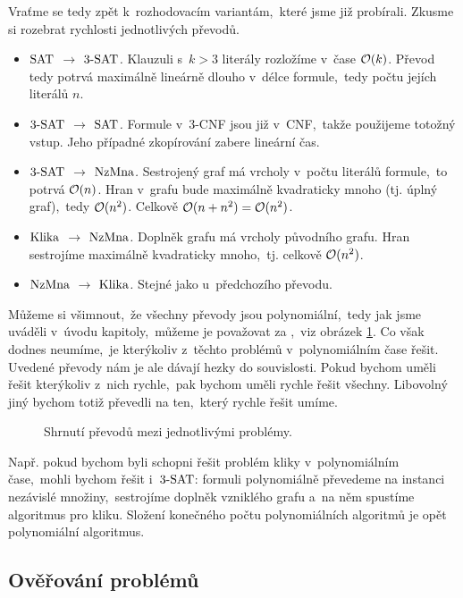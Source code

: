 Vraťme se tedy zpět k~rozhodovacím variantám,~které jsme již probírali. Zkusme si rozebrat rychlosti jednotlivých převodů.
\begin{itemize}
    \item \textit{\ensuremath{\SAT} $\rightarrow$ \ensuremath{\THREESAT}.} Klauzuli s~$k>3$ literály rozložíme v~čase $\mathcal{O}(k)$. Převod tedy potrvá maximálně lineárně dlouho v~délce formule,~tedy počtu jejích literálů $n$.
    \item \textit{\ensuremath{\THREESAT} $\rightarrow$ \ensuremath{\SAT}.} Formule v~$3$-CNF jsou již v~CNF,~takže použijeme totožný vstup. Jeho případné zkopírování zabere lineární čas.
    \item \textit{\ensuremath{\THREESAT} $\rightarrow$ \ensuremath{\NZMNA}.} Sestrojený graf má vrcholy v~počtu literálů formule,~to potrvá $\mathcal{O}(n)$. Hran v~grafu bude maximálně kvadraticky mnoho (tj. úplný graf),~tedy $\mathcal{O}(n^2)$. Celkově $\mathcal{O}(n+n^2)=\mathcal{O}(n^2)$.
    \item \textit{\ensuremath{\KLIKA} $\rightarrow$ \ensuremath{\NZMNA}.} Doplněk grafu má vrcholy původního grafu. Hran sestrojíme maximálně kvadraticky mnoho,~tj. celkově $\mathcal{O}(n^2)$.
    \item \textit{\ensuremath{\NZMNA} $\rightarrow$ \ensuremath{\KLIKA}.} Stejné jako u~předchozího převodu.
\end{itemize}
Můžeme si všimnout,~že všechny převody jsou polynomiální,~tedy jak jsme uváděli v~úvodu kapitoly,~můžeme je považovat za ,~viz obrázek \ref{fig:problemy_souvislost}. Co však dodnes neumíme,~je kterýkoliv z~těchto problémů v~polynomiálním čase řešit. Uvedené převody nám je ale dávají hezky do souvislosti. Pokud bychom uměli řešit kterýkoliv z~nich rychle,~pak bychom uměli rychle řešit všechny. Libovolný jiný bychom totiž převedli na ten,~který rychle řešit umíme.
\begin{figure}[ht]
    \centering
    
    \caption{Shrnutí převodů mezi jednotlivými problémy.}
    \label{fig:problemy_souvislost}
\end{figure}
Např. pokud bychom byli schopni řešit problém kliky v~polynomiálním čase,~mohli bychom řešit i~\ensuremath{\THREESAT}: formuli polynomiálně převedeme na instanci nezávislé množiny,~sestrojíme doplněk vzniklého grafu a~na něm spustíme algoritmus pro kliku. Složení konečného počtu polynomiálních algoritmů je opět polynomiální algoritmus.

\subsection{Ověřování problémů}\label{subsec:overovani_problemu}

